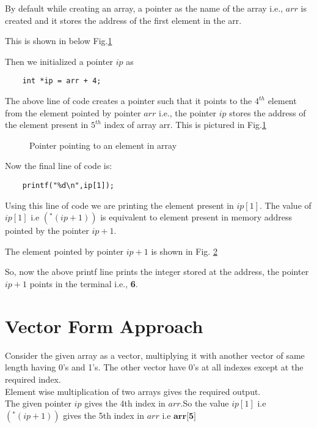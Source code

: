 \documentclass[journal,12pt,twocolumn]{IEEEtran}
\begin{document}
By default while creating an array, a pointer as the name of the array i.e., $arr$ is
created and it stores the address of the first element in the arr.

This is shown in below Fig.\ref{fig:ee18btech11034_2}

Then we initialized a pointer $ip$ as
\begin{lstlisting}
    int *ip = arr + 4;
\end{lstlisting}
The above line of code creates a pointer such that it points to the $4^{th}$ element from the
element pointed by pointer $arr$ i.e., the pointer $ip$ stores the address of the element
present in $5^{th}$ index of array arr. This is pictured in Fig.\ref{fig:ee18btech11034_2}
\begin{figure}[!ht]
    \begin{center}
        \resizebox{\columnwidth}{!}{}
    \end{center}
    \caption{Pointer pointing to an element in array}
    \label{fig:ee18btech11034_2}
\end{figure}

Now the final line of code is:
\begin{lstlisting}
    printf("%d\n",ip[1]);
\end{lstlisting}

Using this line of code we are printing the element present in $ip[1]$. The value of
$ip[1]$ i.e $(^{*}(ip+1))$ is equivalent to element present in memory address pointed by the pointer
$ip+1$.

The element pointed by pointer $ip+1$ is shown in Fig. \ref{fig:ee18btech11034_3}

\begin{figure}[!ht]
    \begin{center}
        \resizebox{\columnwidth}{!}{}
    \end{center}
    \caption{}
    \label{fig:ee18btech11034_3}
\end{figure}

So, now the above printf line prints the integer stored at the address, the pointer $ip+1$
points in the terminal i.e., \textbf{6}.

\section{Vector Form Approach}
Consider the given array as a vector, multiplying it with another vector of same length having 0's and 1's. 
The other vector have 0's at all indexes except at the required index.
\\
Element wise multiplication of two arrays gives the required output.\\
The given pointer $ip$ gives the 4th index in $arr$.So the value $ip[1]$ i.e $(^{*}(ip+1))$ gives the 5th index in $arr$ i.e $\textbf{arr[5]}$\\
\end{document}
